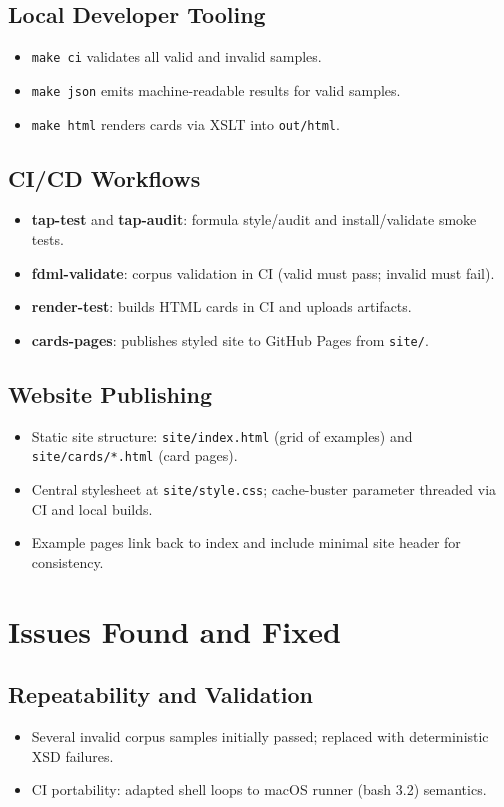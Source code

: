 \documentclass[11pt,a4paper]{article}
\begin{document}
\subsection{Local Developer Tooling}
\begin{itemize}[leftmargin=1.2em]
  \item \texttt{make ci} validates all valid and invalid samples.
  \item \texttt{make json} emits machine-readable results for valid samples.
  \item \texttt{make html} renders cards via XSLT into \texttt{out/html}.
\end{itemize}

\subsection{CI/CD Workflows}
\begin{itemize}[leftmargin=1.2em]
  \item \textbf{tap-test} and \textbf{tap-audit}: formula style/audit and install/validate smoke tests.
  \item \textbf{fdml-validate}: corpus validation in CI (valid must pass; invalid must fail).
  \item \textbf{render-test}: builds HTML cards in CI and uploads artifacts.
  \item \textbf{cards-pages}: publishes styled site to GitHub Pages from \texttt{site/}.
\end{itemize}

\subsection{Website Publishing}
\begin{itemize}[leftmargin=1.2em]
  \item Static site structure: \texttt{site/index.html} (grid of examples) and \texttt{site/cards/*.html} (card pages).
  \item Central stylesheet at \texttt{site/style.css}; cache-buster parameter threaded via CI and local builds.
  \item Example pages link back to index and include minimal site header for consistency.
\end{itemize}

\section{Issues Found and Fixed}
\subsection{Repeatability and Validation}
\begin{itemize}[leftmargin=1.2em]
  \item Several invalid corpus samples initially passed; replaced with deterministic XSD failures.
  \item CI portability: adapted shell loops to macOS runner (bash 3.2) semantics.
\end{itemize}
\end{document}
